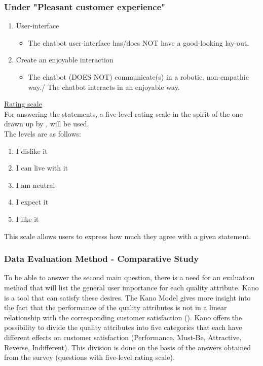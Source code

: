 \subsubsection{Under "Pleasant customer experience"}
\begin{enumerate}
	\item User-interface
	\begin{itemize}
		\item The chatbot user-interface has/does NOT have a good-looking lay-out.
	\end{itemize}
	\item Create an enjoyable interaction
	\begin{itemize}
		\item The chatbot (DOES NOT) communicate(s) in a robotic, non-empathic way./ The chatbot interacts in an enjoyable way.
	\end{itemize}
\end{enumerate}
\ul{Rating scale}\\
For answering the statements, a five-level rating scale in the spirit of the one drawn up by \cite{KANO1984}, will be used.\\
\break
The levels are as follows:\\
\begin{enumerate}
	\item I dislike it
	\item I can live with it
	\item I am neutral
	\item I expect it
	\item I like it
\end{enumerate}
This scale allows users to express how much they agree with a given statement.\\

\subsubsection{Data Evaluation Method - Comparative Study}
To be able to answer the second main question, there is a need for an evaluation method that will list the general user importance for each quality attribute. Kano is a tool that can satisfy these desires. The Kano Model gives more insight into the fact that the performance of the quality attributes is not in a linear relationship with the corresponding customer satisfaction (\cite{KANO1984}). Kano offers the possibility to divide the quality attributes into five categories that each have different effects on customer satisfaction (Performance, Must-Be, Attractive, Reverse, Indifferent). This division is done on the basis of the answers obtained from the survey (questions with five-level rating scale).\\

